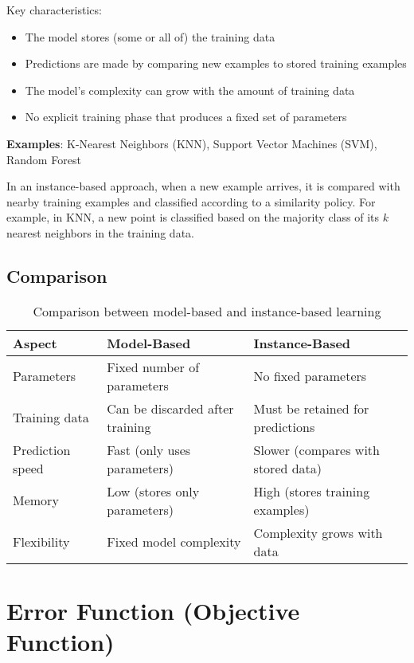 \documentclass[11pt,a4paper]{article}
\theoremstyle{definition}
\theoremstyle{plain}
\theoremstyle{remark}
\begin{document}
Key characteristics:
\begin{itemize}
    \item The model stores (some or all of) the training data
    \item Predictions are made by comparing new examples to stored training examples
    \item The model's complexity can grow with the amount of training data
    \item No explicit training phase that produces a fixed set of parameters
\end{itemize}

\textbf{Examples}: K-Nearest Neighbors (KNN), Support Vector Machines (SVM), Random Forest

In an instance-based approach, when a new example arrives, it is compared with nearby training examples and classified according to a similarity policy. For example, in KNN, a new point is classified based on the majority class of its $k$ nearest neighbors in the training data.

\subsection{Comparison}

\begin{table}[h]
\centering
\begin{tabular}{|l|p{5.5cm}|p{5.5cm}|}
\hline
\textbf{Aspect} & \textbf{Model-Based} & \textbf{Instance-Based} \\
\hline
Parameters & Fixed number of parameters & No fixed parameters \\
\hline
Training data & Can be discarded after training & Must be retained for predictions \\
\hline
Prediction speed & Fast (only uses parameters) & Slower (compares with stored data) \\
\hline
Memory & Low (stores only parameters) & High (stores training examples) \\
\hline
Flexibility & Fixed model complexity & Complexity grows with data \\
\hline
\end{tabular}
\caption{Comparison between model-based and instance-based learning}
\end{table}

\section{Error Function (Objective Function)}
\end{document}
